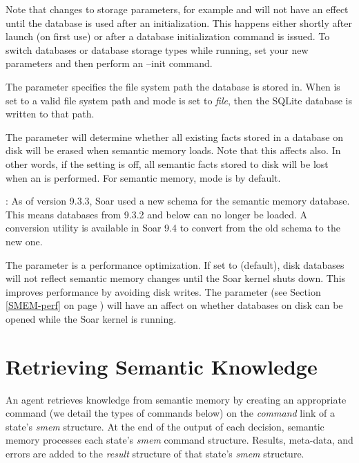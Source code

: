 Note that changes to storage parameters, for example  and  will not have an effect until the database is used after an initialization. This happens either shortly after launch (on first use) or after a database initialization command is issued. To switch databases or database storage types while running, set your new parameters and then perform an --init command.

The  parameter specifies the file system path the database is stored in. When  is set to a valid file system path and  mode is set to \emph{file}, then the SQLite database is written to that path.

The  parameter will determine whether all existing facts stored in a database on disk will be erased when semantic memory loads. Note that this affects  also.  In other words, if the  setting is off, all semantic facts stored to disk will be lost when an  is performed. For semantic memory,  mode is  by default.

: As of version 9.3.3, Soar used a new schema for the semantic memory database. This means databases from 9.3.2 and below can no longer be loaded.  A conversion utility is available in Soar 9.4 to convert from the old schema to the new one.%

The  parameter is a performance optimization. 
If set to  (default), disk databases will not reflect semantic memory changes until the Soar kernel shuts down. 
This improves performance by avoiding disk writes. 
The  parameter (see Section \ref{SMEM-perf} on page \pageref{SMEM-perf}) will have an affect on whether databases on disk can be opened while the Soar kernel is running.


\section{Retrieving Semantic Knowledge}
\label{SMEM-retrieve}

An agent retrieves knowledge from semantic memory by creating an appropriate command (we detail the types of commands below) on the \emph{command} link of a state's \emph{smem} structure. 
At the end of the output of each decision, semantic memory processes each state's \emph{smem} command structure.  
Results, meta-data, and errors are added to the \emph{result} structure of that state's \emph{smem} structure.

